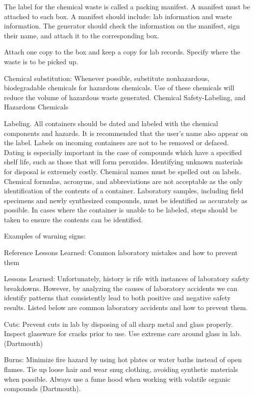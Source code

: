\documentclass[12pt]{../SOP2}
\begin{document}
\NP The label for the chemical waste is called a packing manifest. A manifest must be attached to each box. A manifest should include: lab information and waste information. The generator should check the information on the manifest, sign their name, and attach it to the corresponding box. 

\NP Attach one copy to the box and keep a copy for lab records. Specify where the waste is to be picked up. 

\NP Chemical substitution: Whenever possible, substitute nonhazardous, biodegradable chemicals for hazardous chemicals. Use of these chemicals will reduce the volume of hazardous waste generated. 
Chemical Safety-Labeling, and Hazardous Chemicals

\NP Labeling. All containers should be dated and labeled with the chemical components and hazards. It is recommended that the user’s name also appear on the label. Labels on incoming containers are not to be removed or defaced. Dating is especially important in the case of compounds which have a specified shelf life, such as those that will form peroxides. Identifying unknown materials for disposal is extremely costly. Chemical names must be spelled out on labels. Chemical formulas, acronyms, and abbreviations are not acceptable as the only identification of the contents of a container. Laboratory samples, including field specimens and newly synthesized compounds, must be identified as accurately as possible. In cases where the container is unable to be labeled, steps should be taken to ensure the contents can be identified.


	
Examples of  warning signs:


Reference Lessons Learned: Common laboratory mistakes and how to prevent them

Lessons Learned:
Unfortunately, history is rife with instances of laboratory safety breakdowns.  However, by analyzing the causes of laboratory accidents we can identify patterns that consistently lead to both positive and negative safety results.  Listed below are common laboratory accidents and how to prevent them.

Cuts: Prevent cuts in lab by disposing of all sharp metal and glass properly.  Inspect glassware for cracks prior to use.  Use extreme care around glass in lab. (Dartmouth)

Burns: Minimize fire hazard by using hot plates or water baths instead of open flames.  Tie up loose hair and wear snug clothing, avoiding synthetic materials when possible.  Always use a fume hood when working with volatile organic compounds (Dartmouth).
\end{document}
